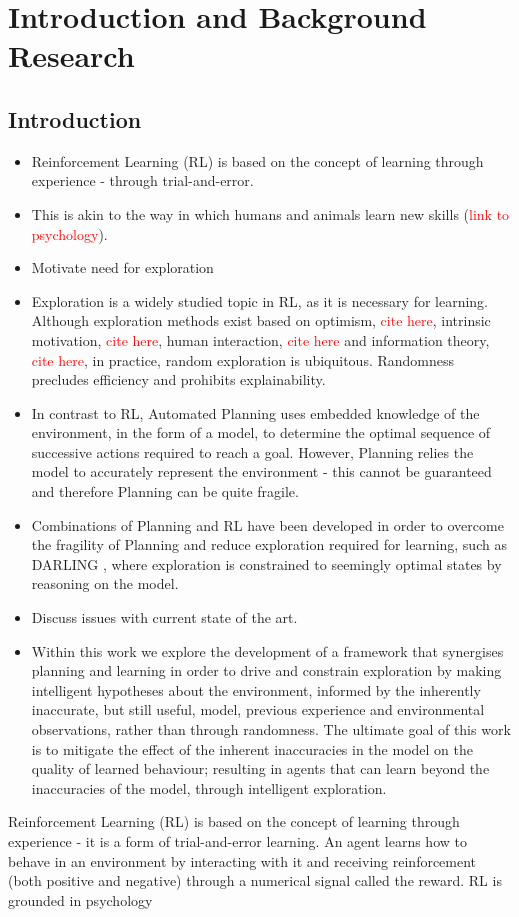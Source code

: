 
\chapter{Introduction and Background Research}

\label{chapter1}
\section{Introduction}
\begin{itemize}
    \item Reinforcement Learning (RL) is based on the concept of learning through experience - through trial-and-error.
    \item  This is akin to the way in which humans and animals learn new skills (\textcolor{red}{link to psychology}).
    \item Motivate need for exploration
    \item Exploration is a widely studied topic in RL, as it is necessary for learning. Although exploration methods exist based on optimism, \textcolor{red}{cite here}, intrinsic motivation, \textcolor{red}{cite here}, human interaction, \textcolor{red}{cite here} and information theory, \textcolor{red}{cite here}, in practice, random exploration is ubiquitous. Randomness precludes efficiency and prohibits explainability.
    \item In contrast to RL, Automated Planning uses embedded knowledge of the environment, in the form of a model, to determine the optimal sequence of successive actions required to reach a goal. However, Planning relies the model to accurately represent  the environment - this cannot be guaranteed and therefore Planning can be quite fragile.
    \item Combinations of Planning and RL have been developed in order to overcome the fragility of Planning and reduce exploration required for learning, such as DARLING \cite{AIJ16-leonetti}, where exploration is constrained to seemingly optimal states by reasoning on the model.
    \item Discuss issues with current state of the art.
    \item Within this work we explore the development of a framework that synergises planning and learning in order to drive and constrain exploration by making intelligent hypotheses about the environment, informed by the inherently inaccurate, but still useful, model, previous experience and environmental observations, rather than through randomness. The ultimate goal of this work is to mitigate the effect of the inherent inaccuracies in the model on the quality of learned behaviour; resulting in agents that can learn beyond the inaccuracies of the model, through intelligent exploration.
\end{itemize}
Reinforcement Learning (RL) is based on the concept of learning through experience - it is a form of trial-and-error learning. An agent learns how to behave in an environment by interacting with it and receiving reinforcement (both positive and negative) through a numerical signal called the reward.
RL is grounded in psychology 


